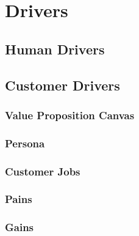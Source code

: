 \section{Drivers}
\label{sec:drivers}

\subsection{Human Drivers}

\subsection{Customer Drivers}

\subsubsection{Value Proposition Canvas}

\subsubsection{Persona}

\subsubsection{Customer Jobs}

\subsubsection{Pains}

\subsubsection{Gains}
